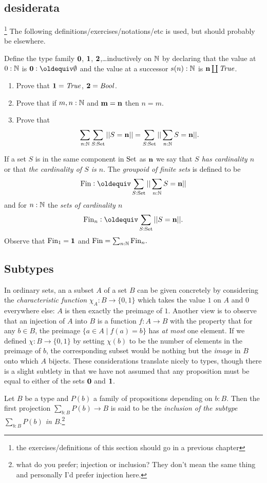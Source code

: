 \label{ch:groups}

\subsection{desiderata}\footnote{the exercises/definitions of this section should go in a previous chapter}
The following definitions/exercises/notations/etc is used, but should probably be elsewhere.

\newcommand{\fin}{\mathrm{Fin}}
\begin{definition}\label{def:finiteset}
   Define the type family $\mathbf{0} $, $\mathbf{1} $, $\mathbf{2} $,\dots inductively on $\mathbb{N}$ by declaring that the value at $0:\mathbb{N}$ is $\bn{0} \defequi\emptyset$ and the value at a successor $s(n):\mathbb{N}$ is $\mathbf{n} \coprod\mathop{\mathit{True}}$.  
  \begin{enumerate}
  \item Prove that $\mathbf{1} =\mathop{\mathit{True}}$, $\mathbf{2} =\mathop{\mathit{Bool}}$. 
  \item Prove that if $m,n:\mathbb{N}$ and $\mathbf m=\mathbf{n} $ then $n=m$.  
  \item   Prove that
$$\sum_{n:\mathbb{N}}\sum_{S:\mathord{\mathrm{Set}}}||S=\mathbf{n} || =\sum_{S:\mathord{\mathrm{Set}}}||\sum_{n:\mathbb{N}}S=\mathbf{n} ||.
$$
  \end{enumerate}
If a set $S$ is in the same component in $\mathord{\mathrm{Set}}$ as $\mathbf{n} $ we say that \emph{$S$ has cardinality $n$} or that \emph{the cardinality of $S$ is $n$}.
The \emph{groupoid of finite sets} is defined to be
$$\fin\defequi\sum_{S:\Set}||\sum_{n:\NN}S=\bn{n} ||$$
and for $n:\mathbb{N}$ the \emph{sets of cardinality $n$}
$$\fin_n\defequi \sum_{S:\Set}||S=\bn{n} ||.$$
Observe that $\fin_1=\bn{1} $ and $\fin=\sum_{n:\NN}\fin_n.$
\subsection{Subtypes}
\label{sec:subtype}

In ordinary sets, an a subset $A$ of a set $B$ can be given concretely by considering the \emph{characteristic function} $\chi_A\colon B\to\{0,1\}$ which takes the value $1$ on $A$ and $0$ everywhere else: $A$ is then exactly the preimage of $1$.  Another view is to observe that an injection of $A$ into $B$ is a function $f\colon A\to B$ with the property that for any $b\in B$, the preimage $\{a\in A\mid f(a)=b\}$ has \emph{at most} one element.  If we defined $\chi\colon B\to \{0,1\}$ by setting $\chi(b)$ to be the number of elements in the preimage of $b$, the corresponding subset would be nothing but the \emph{image} in $B$ onto which $A$ bijects.   These considerations translate nicely to types, though there is a slight subtlety in that we have not assumed that any proposition must be equal to either of the sets $\mathbf{0}$ and $\mathbf{1}$.  
\begin{definition}
  \label{def:subtype}
  Let $B$ be a type and $P(b)$ a family of propositions depending on $b:B$.  Then the first projection $\sum_{b:B}P(b)\to B$ is said to be the \emph{inclusion of the subtype $\sum_{b:B}P(b)$ in $B$}.\footnote{what do you prefer; injection or inclusion?  They don't mean the same thing and personally I'd prefer injection here.}  


\end{definition}
\end{definition}

